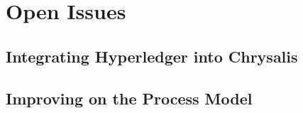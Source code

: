 %
\chapter{Open Issues}
\label{sec:issues}



\section{Integrating Hyperledger into Chrysalis}
\label{sec:issues:intrgration}

\section{Improving on the Process Model}
\label{sec:issues:bpm}

